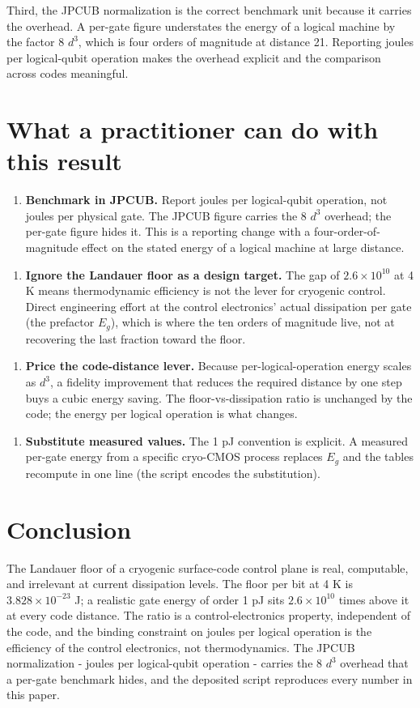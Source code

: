 \documentclass[11pt]{article}
\begin{document}
Third, the JPCUB normalization is the correct benchmark unit because it carries the overhead. A per-gate figure understates the energy of a logical machine by the factor 8 $d^{3}$, which is four orders of magnitude at distance 21. Reporting joules per logical-qubit operation makes the overhead explicit and the comparison across codes meaningful.

\section{What a practitioner can do with this result}
\begin{enumerate}
  \item \textbf{Benchmark in JPCUB.} Report joules per logical-qubit operation, not joules per physical gate. The JPCUB figure carries the 8 $d^{3}$ overhead; the per-gate figure hides it. This is a reporting change with a four-order-of-magnitude effect on the stated energy of a logical machine at large distance.
\end{enumerate}
\begin{enumerate}
  \item \textbf{Ignore the Landauer floor as a design target.} The gap of $2.6\times 10^{10}$ at 4 K means thermodynamic efficiency is not the lever for cryogenic control. Direct engineering effort at the control electronics' actual dissipation per gate (the prefactor $E_{g}$), which is where the ten orders of magnitude live, not at recovering the last fraction toward the floor.
\end{enumerate}
\begin{enumerate}
  \item \textbf{Price the code-distance lever.} Because per-logical-operation energy scales as $d^{3}$, a fidelity improvement that reduces the required distance by one step buys a cubic energy saving. The floor-vs-dissipation ratio is unchanged by the code; the energy per logical operation is what changes.
\end{enumerate}
\begin{enumerate}
  \item \textbf{Substitute measured values.} The 1 pJ convention is explicit. A measured per-gate energy from a specific cryo-CMOS process replaces $E_{g}$ and the tables recompute in one line (the script encodes the substitution).
\end{enumerate}
\section{Conclusion}
The Landauer floor of a cryogenic surface-code control plane is real, computable, and irrelevant at current dissipation levels. The floor per bit at 4 K is $3.828\times 10^{-23}$ J; a realistic gate energy of order 1 pJ sits $2.6\times 10^{10}$ times above it at every code distance. The ratio is a control-electronics property, independent of the code, and the binding constraint on joules per logical operation is the efficiency of the control electronics, not thermodynamics. The JPCUB normalization - joules per logical-qubit operation - carries the 8 $d^{3}$ overhead that a per-gate benchmark hides, and the deposited script reproduces every number in this paper.
\end{document}
